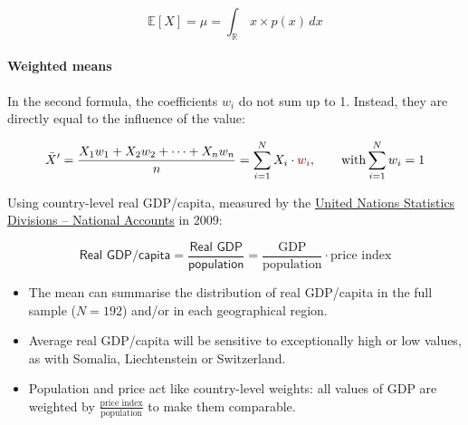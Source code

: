 $$\mathbb{E}[X] = \mu = \int_{\mathbb{R}} \, x \times p(x) \, dx$$



\paragraph{Weighted means}

% 
% 
% 





In the second formula, the coefficients $w_i$ do not sum up to 1. Instead, they are directly equal to the influence of the value:

$$\bar{X}' = \frac{X_1 w_1 + X_2 w_2 + \cdots + X_n w_n}{n} = \sum_{i=1}^N X_i \cdot \hlred{w_i}, \qquad \text{with} \sum_{i=1}^N w_i = 1$$


Using country-level real GDP/capita, measured by the \href{http://unstats.un.org/unsd/snaama/}{United Nations Statistics Divisions -- National Accounts} in 2009:

$$\textsf{Real GDP/capita} = \frac{\textsf{Real GDP}}{\textsf{population}} = \frac{\text{GDP}}{\text{population}} \cdot \text{price index}$$

\begin{itemize}
	\item The mean can summarise the distribution of real GDP/capita in the full sample ($N = 192$) and/or in each geographical region.
	
	\item Average real GDP/capita will be sensitive to exceptionally high or low values, as with Somalia, Liechtenstein or Switzerland.
			
	\item Population and price act like country-level weights: all values of GDP are weighted by $\frac{\text{price index}}{\text{population}}$ to make them comparable.
\end{itemize}


